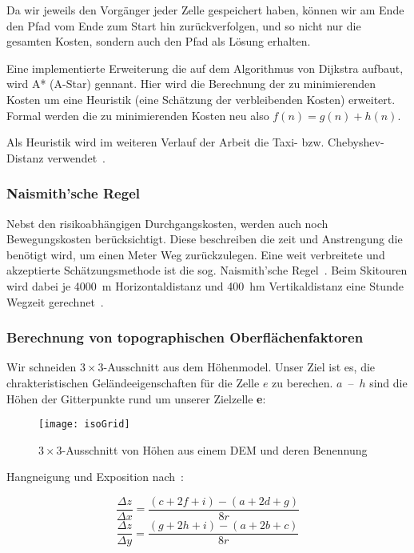 Da wir jeweils den Vorgänger jeder Zelle gespeichert haben, können wir am Ende den Pfad vom Ende zum Start hin zurückverfolgen, und so nicht nur die gesamten Kosten, sondern auch den Pfad als Lösung erhalten.

Eine implementierte Erweiterung die auf dem Algorithmus von Dijkstra aufbaut, wird A* (A-Star) gennant. Hier wird die Berechnung der zu minimierenden Kosten um eine Heuristik (eine Schätzung der verbleibenden Kosten) erweitert. Formal werden die zu minimierenden Kosten neu also $f(n)=g(n)+h(n)$.~\cite{Hart1968}

Als Heuristik wird im weiteren Verlauf der Arbeit die Taxi- bzw. Chebyshev-Distanz verwendet~\cite{cantrell2000modern}.

\subsubsection{Naismith'sche Regel}

Nebst den risikoabhängigen Durchgangskosten, werden auch noch Bewegungskosten berücksichtigt. Diese beschreiben die zeit und Anstrengung die benötigt wird, um einen Meter Weg zurückzulegen. Eine weit verbreitete und akzeptierte Schätzungsmethode ist die sog. Naismith'sche Regel~\cite{naismithsrule}.
Beim Skitouren wird dabei je \qty{4000}{m} Horizontaldistanz und \qty{400}{hm} Vertikaldistanz eine Stunde Wegzeit gerechnet~\cite{sacbergspwinter}\cite{naismithsrule}.


\subsubsection{Berechnung von topographischen Oberflächenfaktoren}

Wir schneiden $3 \times 3$-Ausschnitt aus dem Höhenmodel. Unser Ziel ist es, die chrakteristischen Geländeeigenschaften für die Zelle $e$ zu berechen.
$a$~--~$h$ sind die Höhen der Gitterpunkte rund um unserer Zielzelle \textbf{e}:

\begin{figure}[H]
  \centering
  \texttt{[image: isoGrid]}
  \caption{$3 \times 3$-Ausschnitt von Höhen aus einem DEM und deren Benennung}
\end{figure}

Hangneigung und Exposition nach~\cite{gisslopeaspect}:

\begin{equation} \label{eq1}
  \frac{\Delta z}{\Delta x} = \frac{(c + 2f + i) - (a + 2d + g)}{8r}
\end{equation}
\begin{equation} \label{eq2}
  \frac{\Delta z}{\Delta y} = \frac{(g + 2h + i) - (a + 2b + c)}{8r}
\end{equation}

